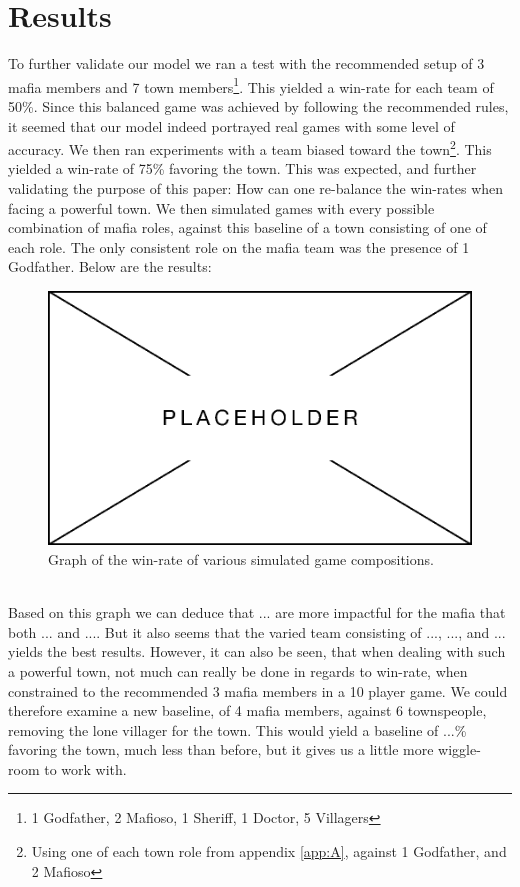 \section{Results}\label{sec:results}
To further validate our model we ran a test with the recommended setup of 3 
mafia members and 7 town members\footnote[1]{1 Godfather, 2 Mafioso, 1 Sheriff, 
1 
Doctor, 5 Villagers}. This yielded a win-rate for each team of 50\%. Since this 
balanced game was achieved by following the recommended rules, it seemed that 
our model indeed portrayed real games with some level of accuracy. We then ran 
experiments with a team biased toward the town\footnote{Using one of each 
town 
role from appendix \ref{app:A}, against 1 Godfather, and 2 Mafioso}. This 
yielded a win-rate of 75\% favoring the town. This was expected, and further 
validating 
the purpose of this paper: How can one re-balance the win-rates when facing a 
powerful town. We then simulated games with every possible combination of mafia 
roles, against this baseline of a town consisting of one of each role. The only 
consistent role on the mafia team was the presence of 1 Godfather. Below are 
the results: \\
\begin{figure}[h]
	\includegraphics[width=1\linewidth]{figures/placeholder}
	\caption{Graph of the win-rate of various simulated game compositions.}
	\label{fig:placeholder}
\end{figure}
\\Based on this graph we can deduce that ... are more impactful for the mafia 
that both ... and .... But it also seems that the varied team consisting of 
..., ..., and ... yields the best results. However, it can also be seen, that 
when dealing with such a powerful town, not much can really be done in regards 
to win-rate, when constrained to the recommended 3 mafia members in a 10 player 
game. We could therefore examine a new baseline, of 4 mafia members, against 6 
townspeople, removing the lone villager for the town. This would yield a 
baseline of ...\% favoring the town, much less than before, but it gives us a 
little more wiggle-room to work with.